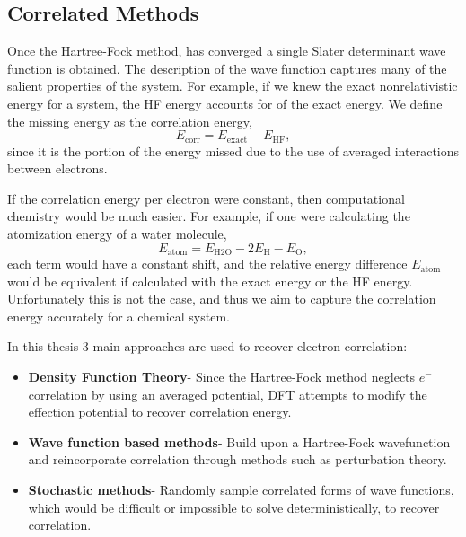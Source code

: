 \subsection{Correlated Methods}
Once the Hartree-Fock method, has converged a single Slater determinant wave function is obtained.
The description of the wave function captures many of the salient properties of the system.
For example, if we knew the exact nonrelativistic energy for a system, the HF energy accounts for  of the exact energy.
We define the missing energy as the correlation energy,
\begin{equation}
E_{\mathrm{corr}} = E_{\mathrm{exact}} - E_{\mathrm{HF}},
\end{equation}
since it is the portion of the energy missed due to the use of averaged interactions between electrons.

If the correlation energy per electron were constant, then computational chemistry would be much easier.
For example, if one were calculating the atomization energy of a water molecule,
\begin{equation}
    E_{\mathrm{atom}} = E_{\mathrm{H2O}} - 2 E_{\mathrm{H}} - E_{\mathrm{O}},
\end{equation}
each term would have a constant shift, and the relative energy difference $E_{\mathrm{atom}}$ would be equivalent if calculated with the exact energy or the HF energy.
Unfortunately this is not the case, and thus we aim to capture the correlation energy accurately for a chemical system.

In this thesis 3 main approaches are used to recover electron correlation:
\begin{itemize}
\item \textbf{Density Function Theory}- Since the Hartree-Fock method neglects $e^{-}$ correlation by using an averaged potential, DFT attempts to modify the effection potential to recover correlation energy.
\item \textbf{Wave function based methods}- Build upon a Hartree-Fock wavefunction and reincorporate correlation through methods such as perturbation theory.
\item \textbf{Stochastic methods}- Randomly sample correlated forms of wave functions, which would be difficult or impossible to solve deterministically, to recover correlation.
\end{itemize}
